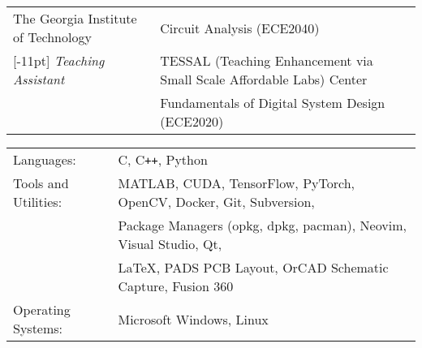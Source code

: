 \documentclass[14pt,letterpaper]{extarticle}
\begin{document}

%


\medskip\noindent
\begin{tabularx}{\linewidth}{@{}lL@{}}
\footnotesize{The Georgia Institute of Technology} & \footnotesize{Circuit Analysis (ECE2040)}\\
[-11pt]
\footnotesize{\textit{Teaching Assistant}} & \footnotesize{TESSAL (Teaching Enhancement via Small Scale Affordable Labs) Center}\\
& \footnotesize{Fundamentals of Digital System Design
(ECE2020)}\\
\end{tabularx}

\pagebreak
{}

\medskip\noindent
\begin{tabularx}{\linewidth}{@{}lL@{}}
\footnotesize{Languages:} & \footnotesize{C, C\texttt{++}, Python}\vspace{0.5mm}\\
\footnotesize{Tools and Utilities:} & \footnotesize{MATLAB, CUDA, TensorFlow, PyTorch, OpenCV, Docker, Git, Subversion,}\\
                                    & \footnotesize{Package Managers (opkg, dpkg, pacman), Neovim, Visual Studio, Qt,}\\
                                    & \footnotesize{\LaTeX, PADS PCB Layout, OrCAD Schematic Capture, Fusion 360}\vspace{0.5mm}\\
\footnotesize{Operating Systems:}   & \footnotesize{Microsoft Windows, Linux}\\
\end{tabularx}
\end{document}
